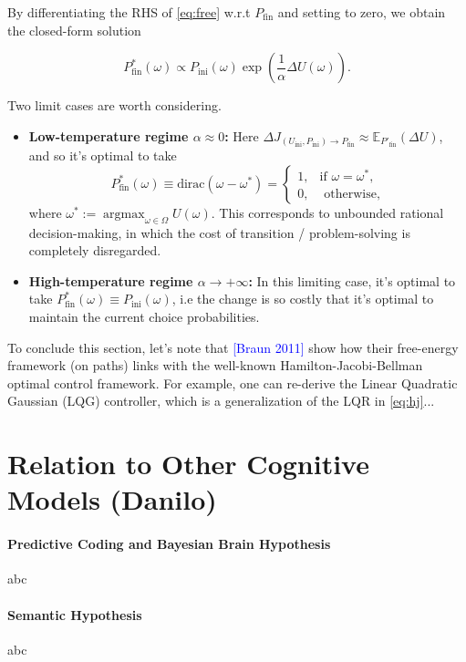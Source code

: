\documentclass{article} %
\DeclareMathOperator{\argmax}{argmax}
\begin{document}
By differentiating the RHS of \eqref{eq:free} w.r.t $P_{\text{fin}}$ and setting to zero, we obtain the closed-form solution

\begin{equation}
  P^*_{\text{fin}}(\omega) \propto P_{\text{ini}}(\omega)\exp\left(\frac{1}{\alpha}\Delta U(\omega)\right).
\end{equation}

Two limit cases are worth considering.
\begin{itemize}
\item \textbf{Low-temperature regime $\alpha \approx 0$:} Here $\Delta J_{(U_{\text{ini}}, P_{\text{ini}}) \rightarrow P_{\text{fin}}} \approx \mathbb E_{P'_{\text{fin}}}(\Delta U)$, and so it's optimal to take
  $$P^*_{\text{fin}}(\omega) \equiv \text{dirac}(\omega - \omega^*) = \begin{cases}1, &\mbox{if }\omega = \omega^*,\\0, &\mbox{ otherwise,}\end{cases}$$
  where $\omega^* := \argmax_{\omega \in \Omega}U(\omega)$. This corresponds to unbounded rational decision-making, in which the cost of transition / problem-solving is completely disregarded.
  \item \textbf{High-temperature regime $\alpha \rightarrow +\infty$:} In this limiting case, it's optimal to take $P^*_{\text{fin}}(\omega) \equiv P_{\text{ini}}(\omega)$, i.e the change is so costly that it's optimal to maintain the current choice probabilities.
\end{itemize}

To conclude this section, let's note that \textcolor{blue}{[Braun 2011]} show how their free-energy framework (on paths) links with the well-known Hamilton-Jacobi-Bellman optimal control framework. For example, one can re-derive the Linear Quadratic Gaussian (LQG) controller, which is a generalization of the LQR in \eqref{eq:hj}...


\section{Relation to Other Cognitive Models (Danilo)}
\paragraph{Predictive Coding and Bayesian Brain Hypothesis}
abc

\paragraph{Semantic Hypothesis}
abc
\end{document}
